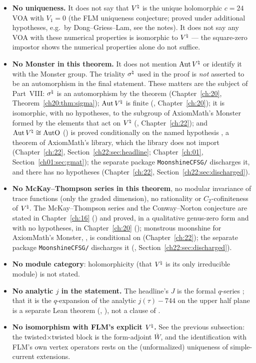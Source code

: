 \begin{itemize}
\item \textbf{No uniqueness.}  It does not say that ${V^{\natural}}$ is the unique holomorphic $c=24$ VOA with
  $V_1=0$ (the FLM uniqueness conjecture; proved under additional hypotheses, e.g.\ by
  Dong--Griess--Lam, see the notes).  It does not say any VOA with these numerical properties is
  isomorphic to ${V^{\natural}}$ — the square-zero impostor shows the numerical properties alone do not suffice.
\item \textbf{No Monster in this theorem.}  It does not mention $\operatorname{Aut}{V^{\natural}}$ or identify it with the Monster group.
  The triality $\sigma^{\natural}$ used in the proof is \emph{not} asserted to be an automorphism in the final
  statement.  These matters are the subject of Part~VIII: $\sigma^{\natural}$ is an automorphism by the theorem
   (Chapter~\ref{ch:20}, Theorem~\ref{ch20:thm:sigma}); $\operatorname{Aut}{V^{\natural}}$ is finite
  (, Chapter~\ref{ch:20}); it is isomorphic, with no hypotheses, to the subgroup of
  AxiomMath's Monster  formed by the elements that act on ${V^{\natural}}$
  (, Chapter~\ref{ch:22}); and $\operatorname{Aut}{V^{\natural}}\cong\mathrm{AutO}$
  () is proved conditionally on the named hypothesis , a theorem of
  AxiomMath's library, which the library does not import (Chapter~\ref{ch:22}, Section~\ref{ch22:sec:headline};
  Chapter~\ref{ch:01}, Section~\ref{ch01:sec:gmat}); the separate package \texttt{MoonshineCFSG/} discharges it, and
  there  has no hypotheses (Chapter~\ref{ch:22}, Section~\ref{ch22:sec:discharged}).
\item \textbf{No McKay--Thompson series in this theorem}, no modular invariance of trace functions (only the graded
  dimension), no rationality or $C_2$-cofiniteness of ${V^{\natural}}$.  The McKay--Thompson series and the Conway--Norton
  conjecture are stated in Chapter~\ref{ch:16} () and proved, in a qualitative genus-zero
  form and with no hypotheses, in Chapter~\ref{ch:20} (); monstrous moonshine for AxiomMath's Monster,
  , is conditional on  (Chapter~\ref{ch:22}); the separate package
  \texttt{MoonshineCFSG/} discharges it (, Section~\ref{ch22:sec:discharged}).
\item \textbf{No module category}: holomorphicity (that ${V^{\natural}}$ is its only irreducible module) is not
  stated.
\item \textbf{No analytic $j$ in the statement.}  The headline's $J$ is the formal $q$-series ; that it is
  the $q$-expansion of the analytic $j(\tau)-744$ on the upper half plane is a separate Lean theorem
  (, ), not a clause of .
\item \textbf{No isomorphism with FLM's explicit ${V^{\natural}}$.}  See the previous subsection: the
  twisted$\times$twisted block is the form-adjoint $\overline W$, and the identification with FLM's own
  vertex operators rests on the (unformalized) uniqueness of simple-current extensions.
\end{itemize}
